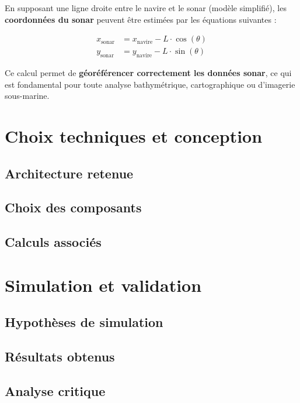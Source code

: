 \documentclass[12pt,a4paper]{report}
\begin{document}
En supposant une ligne droite entre le navire et le sonar (modèle simplifié), les \textbf{coordonnées du sonar} peuvent être estimées par les équations suivantes :

\begin{align*}
x_{\text{sonar}} &= x_{\text{navire}} - L \cdot \cos(\theta) \\
y_{\text{sonar}} &= y_{\text{navire}} - L \cdot \sin(\theta)
\end{align*}

Ce calcul permet de \textbf{géoréférencer correctement les données sonar}, ce qui est fondamental pour toute analyse bathymétrique, cartographique ou d'imagerie sous-marine.


\section{Choix techniques et conception}

\subsection{Architecture retenue}
\subsection{Choix des composants}
\subsection{Calculs associés}





\section{Simulation et validation}

\subsection{Hypothèses de simulation}
\subsection{Résultats obtenus}
\subsection{Analyse critique}
\end{document}
